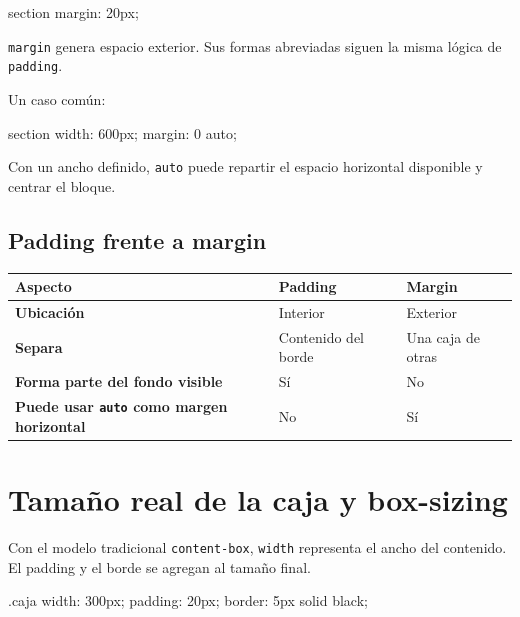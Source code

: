 \documentclass[11pt]{article}
\begin{document}
    \begin{csscodedark}
        section {
            margin: 20px;
        }
    \end{csscodedark}

    \texttt{margin} genera espacio exterior. Sus formas abreviadas siguen la misma lógica de \texttt{padding}.

    Un caso común:

    \begin{csscodedark}
        section {
            width: 600px;
            margin: 0 auto;
        }
    \end{csscodedark}

    Con un ancho definido, \texttt{auto} puede repartir el espacio horizontal disponible y centrar el bloque.

    \subsection{Padding frente a margin}

    \begin{center}
        \begin{tabularx}{0.9\textwidth}{>{\bfseries}p{7cm}X X}
            \toprule
            Aspecto & Padding & Margin \\
            \midrule
            Ubicación & Interior & Exterior \\
            Separa & Contenido del borde & Una caja de otras \\
            Forma parte del fondo visible & Sí & No \\
            Puede usar \texttt{auto} como margen horizontal & No & Sí \\
            \bottomrule
        \end{tabularx}
    \end{center}

    \section{Tamaño real de la caja y box-sizing}

    Con el modelo tradicional \texttt{content-box}, \texttt{width} representa el ancho del contenido. El padding y el borde se agregan al tamaño final.

    \begin{csscodedark}
        .caja {
            width: 300px;
            padding: 20px;
            border: 5px solid black;
        }
    \end{csscodedark}
\end{document}
